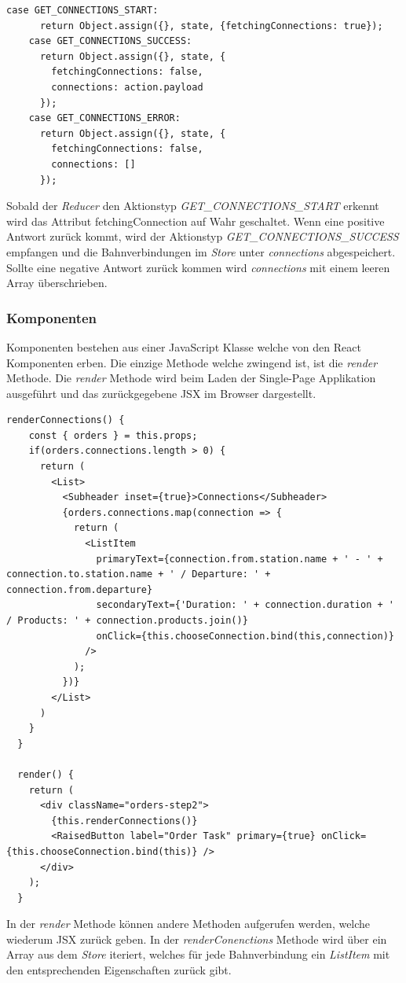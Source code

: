 \begin{lstlisting}[caption=Reducer getConnections]
    case GET_CONNECTIONS_START:
      return Object.assign({}, state, {fetchingConnections: true});
    case GET_CONNECTIONS_SUCCESS:
      return Object.assign({}, state, {
        fetchingConnections: false,
        connections: action.payload
      });
    case GET_CONNECTIONS_ERROR:
      return Object.assign({}, state, {
        fetchingConnections: false,
        connections: []
      });
\end{lstlisting}

Sobald der \textit{Reducer} den Aktionstyp \textit{GET\_CONNECTIONS\_START} erkennt wird das Attribut fetchingConnection auf Wahr geschaltet. Wenn eine positive Antwort zurück kommt, wird der Aktionstyp \textit{GET\_CONNECTIONS\_SUCCESS} empfangen und die Bahnverbindungen im \textit{Store} unter \textit{connections} abgespeichert. Sollte eine negative Antwort zurück kommen wird \textit{connections} mit einem leeren Array überschrieben.

\subsubsection{Komponenten}
Komponenten bestehen aus einer JavaScript Klasse welche von den React Komponenten erben. Die einzige Methode welche zwingend ist, ist die \textit{render} Methode. Die \textit{render} Methode wird beim Laden der Single-Page Applikation ausgeführt und das zurückgegebene JSX im Browser dargestellt.

\begin{lstlisting}[caption=Render Methode der OrderStep2 Komponente]
  renderConnections() {
    const { orders } = this.props;
    if(orders.connections.length > 0) {
      return (
        <List>
          <Subheader inset={true}>Connections</Subheader>
          {orders.connections.map(connection => {
            return (
              <ListItem
                primaryText={connection.from.station.name + ' - ' + connection.to.station.name + ' / Departure: ' + connection.from.departure}
                secondaryText={'Duration: ' + connection.duration + ' / Products: ' + connection.products.join()}
                onClick={this.chooseConnection.bind(this,connection)}
              />
            );
          })}
        </List>
      )
    }
  }

  render() {
    return (
      <div className="orders-step2">
        {this.renderConnections()}
        <RaisedButton label="Order Task" primary={true} onClick={this.chooseConnection.bind(this)} />
      </div>
    );
  }
\end{lstlisting}

In der \textit{render} Methode können andere Methoden aufgerufen werden, welche wiederum JSX zurück geben. In der \textit{renderConenctions} Methode wird über ein Array aus dem \textit{Store} iteriert, welches für jede Bahnverbindung ein \textit{ListItem} mit den entsprechenden Eigenschaften zurück gibt.

